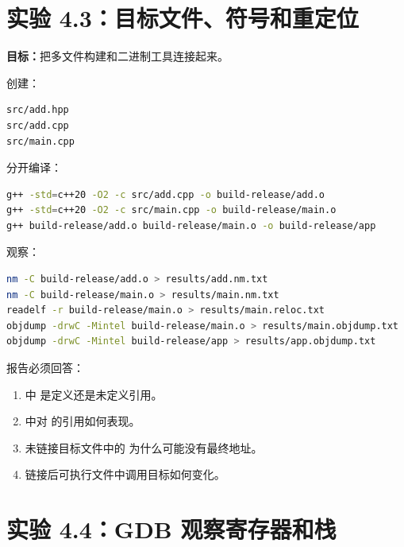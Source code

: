 \section{实验 4.3：目标文件、符号和重定位}

\begin{labbox}
\textbf{目标：}把多文件构建和二进制工具连接起来。

创建：

\begin{lstlisting}
src/add.hpp
src/add.cpp
src/main.cpp
\end{lstlisting}

分开编译：

\begin{lstlisting}[language=bash]
g++ -std=c++20 -O2 -c src/add.cpp -o build-release/add.o
g++ -std=c++20 -O2 -c src/main.cpp -o build-release/main.o
g++ build-release/add.o build-release/main.o -o build-release/app
\end{lstlisting}

观察：

\begin{lstlisting}[language=bash]
nm -C build-release/add.o > results/add.nm.txt
nm -C build-release/main.o > results/main.nm.txt
readelf -r build-release/main.o > results/main.reloc.txt
objdump -drwC -Mintel build-release/main.o > results/main.objdump.txt
objdump -drwC -Mintel build-release/app > results/app.objdump.txt
\end{lstlisting}

报告必须回答：

\begin{enumerate}
  \item {} 中  是定义还是未定义引用。
  \item {} 中对  的引用如何表现。
  \item 未链接目标文件中的  为什么可能没有最终地址。
  \item 链接后可执行文件中调用目标如何变化。
\end{enumerate}
\end{labbox}

\section{实验 4.4：GDB 观察寄存器和栈}

